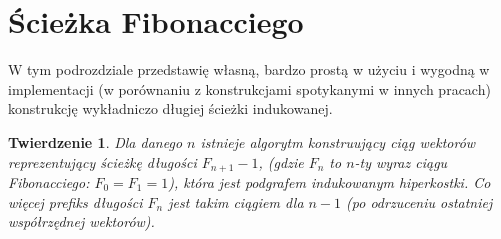 \documentclass{pracamgr}
\newtheorem{theorem}{Twierdzenie}[chapter]
\begin{document}
   \section{Ścieżka Fibonacciego}
    W tym podrozdziale przedstawię własną, bardzo prostą w użyciu i wygodną w implementacji
    (w porównaniu z konstrukcjami spotykanymi w innych pracach) konstrukcję wykładniczo długiej ścieżki indukowanej.\newpage
    \begin{theorem}\label{co najmniej fibo}
     Dla danego $n$ istnieje algorytm konstruujący ciąg wektorów reprezentujący ścieżkę długości $F_{n+1}-1$,
     (gdzie $F_n$ to $n$-ty wyraz ciągu Fibonacciego: $F_0=F_1=1$), która jest podgrafem indukowanym hiperkostki.
     Co więcej prefiks długości $F_{n}$ jest takim ciągiem dla $n-1$ (po odrzuceniu ostatniej współrzędnej wektorów).
    \end{theorem}
\end{document}
